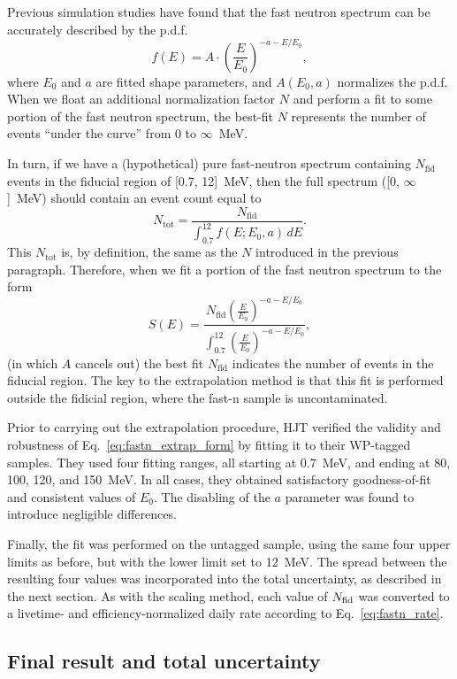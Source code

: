 \documentclass[../thesis.tex]{subfiles}
\begin{document}
Previous simulation studies have found that the fast neutron spectrum can be
accurately described by the p.d.f.
\[ f(E) = A \cdot \left( \frac{E}{E_0} \right)^{-a-E/E_0}, \] where $E_0$ and
$a$ are fitted shape parameters, and $A(E_0, a)$ normalizes the p.d.f. When we
float an additional normalization factor $N$ and perform a fit to some portion
of the fast neutron spectrum, the best-fit $N$ represents the number of events
``under the curve'' from 0 to $\infty$~MeV.

In turn, if we have a (hypothetical) pure fast-neutron spectrum containing
$N_\mathrm{fid}$ events in the fiducial region of [0.7, 12]~MeV, then the full
spectrum ([0, $\infty$]~MeV) should contain an event count equal to
\[ N_\mathrm{tot} = \frac{N_\mathrm{fid}}{\int_{0.7}^{12} f(E; E_0, a)\,dE }. \]
This $N_\mathrm{tot}$ is, by definition, the same as the $N$ introduced in the
previous paragraph. Therefore, when we fit a portion of the fast neutron
spectrum to the form
\begin{equation}
  \label{eq:fastn_extrap_form}
  S(E) = \frac{N_\mathrm{fid} \left( \frac{E}{E_0} \right)^{-a-E/E_0}}
  {\int_{0.7}^{12} \left( \frac{E}{E_0} \right)^{-a-E/E_0} },
\end{equation}
(in which $A$ cancels out) the best fit $N_\mathrm{fid}$ indicates the number of
events in the fiducial region. The key to the extrapolation method is that this
fit is performed outside the fidicial region, where the fast-n sample is
uncontaminated.

Prior to carrying out the extrapolation procedure, HJT verified the validity and
robustness of Eq.~\ref{eq:fastn_extrap_form} by fitting it to their WP-tagged
samples. They used four fitting ranges, all starting at 0.7~MeV, and ending at
80, 100, 120, and 150~MeV. In all cases, they obtained satisfactory
goodness-of-fit and consistent values of $E_0$. The disabling of the $a$
parameter was found to introduce negligible differences.

Finally, the fit was performed on the untagged sample, using the same four upper
limits as before, but with the lower limit set to 12~MeV. The spread between the
resulting four values was incorporated into the total uncertainty, as described
in the next section. As with the scaling method, each value of $N_\mathrm{fid}$ was
converted to a livetime- and efficiency-normalized daily rate according to
Eq.~\ref{eq:fastn_rate}.

\subsection{Final result and total uncertainty}
\label{sec:fastn_comb}
\end{document}
